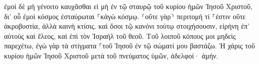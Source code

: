 \documentclass{openreader}
\begin{document}
ἐμοὶ δὲ μὴ γένοιτο καυχᾶσθαι εἰ μὴ ἐν τῷ σταυρῷ τοῦ κυρίου ἡμῶν Ἰησοῦ Χριστοῦ, δι’ οὗ ἐμοὶ κόσμος ἐσταύρωται ⸀κἀγὼ κόσμῳ. 
⸂οὔτε γὰρ⸃ περιτομή τί ⸀ἐστιν οὔτε ἀκροβυστία, ἀλλὰ καινὴ κτίσις. 
καὶ ὅσοι τῷ κανόνι τούτῳ στοιχήσουσιν, εἰρήνη ἐπ’ αὐτοὺς καὶ ἔλεος, καὶ ἐπὶ τὸν Ἰσραὴλ τοῦ θεοῦ. 
Τοῦ λοιποῦ κόπους μοι μηδεὶς παρεχέτω, ἐγὼ γὰρ τὰ στίγματα ⸀τοῦ Ἰησοῦ ἐν τῷ σώματί μου βαστάζω. 
Ἡ χάρις τοῦ κυρίου ἡμῶν Ἰησοῦ Χριστοῦ μετὰ τοῦ πνεύματος ὑμῶν, ἀδελφοί· ἀμήν. 
\end{document}
